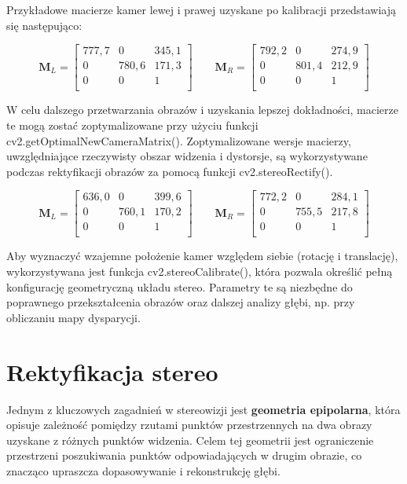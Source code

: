 \documentclass[magisterska]{pracadypl}
\begin{document}
Przykładowe macierze kamer lewej i prawej uzyskane po kalibracji przedstawiają się następująco:

\[
\mathbf{M}_L =
\begin{bmatrix}
777,7 & 0 & 345,1 \\
0 & 780,6 & 171,3 \\
0 & 0 & 1 \\
\end{bmatrix}
\qquad
\mathbf{M}_R =
\begin{bmatrix}
792,2 & 0 & 274,9 \\
0 & 801,4 & 212,9 \\
0 & 0 & 1 \\
\end{bmatrix}
\]

W celu dalszego przetwarzania obrazów i uzyskania lepszej dokładności, macierze te mogą zostać zoptymalizowane przy użyciu funkcji cv2.getOptimalNewCameraMatrix(). Zoptymalizowane wersje macierzy, uwzględniające rzeczywisty obszar widzenia i dystorsje, są wykorzystywane podczas rektyfikacji obrazów za pomocą funkcji cv2.stereoRectify().

\[
\mathbf{M}_L =
\begin{bmatrix}
636,0 & 0 & 399,6 \\
0 & 760,1 & 170,2 \\
0 & 0 & 1 \\
\end{bmatrix}
\qquad
\mathbf{M}_R =
\begin{bmatrix}
772,2 & 0 & 284,1 \\
0 & 755,5 & 217,8 \\
0 & 0 & 1 \\
\end{bmatrix}
\]

Aby wyznaczyć wzajemne położenie kamer względem siebie (rotację i translację), wykorzystywana jest funkcja cv2.stereoCalibrate(), która pozwala określić pełną konfigurację geometryczną układu stereo. Parametry te są niezbędne do poprawnego przekształcenia obrazów oraz dalszej analizy głębi, np. przy obliczaniu mapy dysparycji.

\section{Rektyfikacja stereo}

Jednym z kluczowych zagadnień w stereowizji jest \textbf{geometria epipolarna}, która opisuje zależność pomiędzy rzutami punktów przestrzennych na dwa obrazy uzyskane z różnych punktów widzenia. Celem tej geometrii jest ograniczenie przestrzeni poszukiwania punktów odpowiadających w drugim obrazie, co znacząco upraszcza dopasowywanie i rekonstrukcję głębi.
\end{document}
